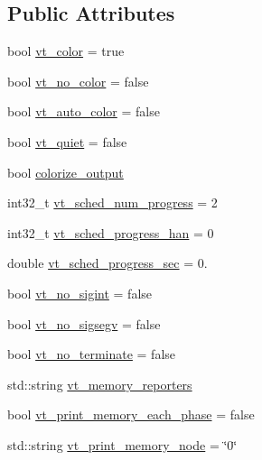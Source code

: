 \subsection*{Public Attributes}
\begin{DoxyCompactItemize}
\item 
bool \hyperlink{structvt_1_1arguments_1_1_app_config_a8add08e932dec103e52255fd77e15b0f}{vt\+\_\+color} = true
\item 
bool \hyperlink{structvt_1_1arguments_1_1_app_config_ac3821fd047fac387f9086b165f341bf6}{vt\+\_\+no\+\_\+color} = false
\item 
bool \hyperlink{structvt_1_1arguments_1_1_app_config_ab0d9d89764f3dde07ebb0cbf67b60c9b}{vt\+\_\+auto\+\_\+color} = false
\item 
bool \hyperlink{structvt_1_1arguments_1_1_app_config_ad0dc6c132075d1b94373d298988d1825}{vt\+\_\+quiet} = false
\item 
bool \hyperlink{structvt_1_1arguments_1_1_app_config_abedaac3de66d21a54052e2e9ba8bca27}{colorize\+\_\+output}
\item 
int32\+\_\+t \hyperlink{structvt_1_1arguments_1_1_app_config_a2b88484f357d03bcb8690a7be8f98f1f}{vt\+\_\+sched\+\_\+num\+\_\+progress} = 2
\item 
int32\+\_\+t \hyperlink{structvt_1_1arguments_1_1_app_config_adea83e3068b3a30b9e0e45740e9a3587}{vt\+\_\+sched\+\_\+progress\+\_\+han} = 0
\item 
double \hyperlink{structvt_1_1arguments_1_1_app_config_a93172de4d36eb63c2619ab9508f46058}{vt\+\_\+sched\+\_\+progress\+\_\+sec} = 0.
\item 
bool \hyperlink{structvt_1_1arguments_1_1_app_config_a1547bc236f0192f89dec89409bdfeabc}{vt\+\_\+no\+\_\+sigint} = false
\item 
bool \hyperlink{structvt_1_1arguments_1_1_app_config_a819ba88b195cfd735798fbcb18e36408}{vt\+\_\+no\+\_\+sigsegv} = false
\item 
bool \hyperlink{structvt_1_1arguments_1_1_app_config_aceae5a1e67a5001dc56d4fa352dddf4a}{vt\+\_\+no\+\_\+terminate} = false
\item 
std\+::string \hyperlink{structvt_1_1arguments_1_1_app_config_acb03c37af0097278fddcdd456e5312de}{vt\+\_\+memory\+\_\+reporters}
\item 
bool \hyperlink{structvt_1_1arguments_1_1_app_config_ab7fd4a5032ddaca35301d27eb63d9d02}{vt\+\_\+print\+\_\+memory\+\_\+each\+\_\+phase} = false
\item 
std\+::string \hyperlink{structvt_1_1arguments_1_1_app_config_a4273792bc9a8537b18549d54d58417dd}{vt\+\_\+print\+\_\+memory\+\_\+node} = \char`\"{}0\char`\"{}

\end{DoxyCompactItemize}
